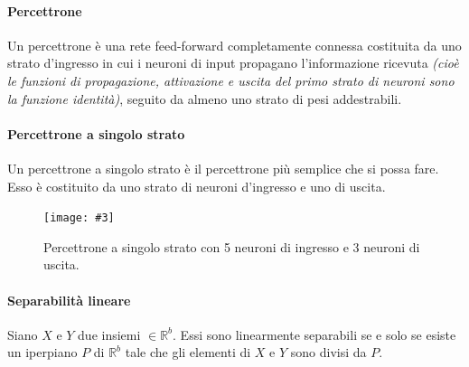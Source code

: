 \documentclass[12pt, twoside, letterpaper]{report}
\newcommand{\img}[4] {
	\begin{figure}
		\centering
		\texttt{[image: \#3]}\\
		\caption{#1}
		\label{#4}
	\end{figure}
}
\begin{document}
			\paragraph{Percettrone} Un percettrone è una rete feed-forward completamente connessa costituita da uno strato d'ingresso in cui i neuroni di input propagano l'informazione ricevuta \textit{(cioè le funzioni di propagazione, attivazione e uscita del primo strato di neuroni sono la funzione identità)}, seguito da almeno uno strato di pesi addestrabili.
			
			\paragraph{Percettrone a singolo strato} Un percettrone a singolo strato è il percettrone più semplice che si possa fare. Esso è costituito da uno strato di neuroni d'ingresso e uno di uscita. 
				\img{Percettrone a singolo strato con 5 neuroni di ingresso e 3 neuroni di uscita. \cite{kriesel}}{0.5}{slp.png}{slp} 
				
			\paragraph{Separabilità lineare} Siano $X$ e $Y$ due insiemi $\in \mathbb{R}^b$. Essi sono linearmente separabili se e solo se esiste un iperpiano $P$ di $\mathbb{R}^b$ tale che gli elementi di $X$ e $Y$ sono divisi da $P$. 
			
\end{document}
